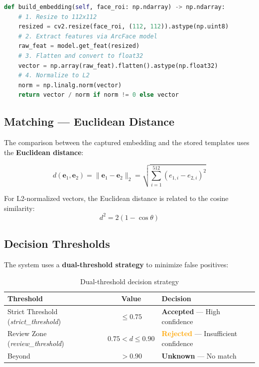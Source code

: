 \begin{lstlisting}[language=Python, caption={Building an ArcFace embedding}]
def build_embedding(self, face_roi: np.ndarray) -> np.ndarray:
    # 1. Resize to 112x112
    resized = cv2.resize(face_roi, (112, 112)).astype(np.uint8)
    # 2. Extract features via ArcFace model
    raw_feat = model.get_feat(resized)
    # 3. Flatten and convert to float32
    vector = np.array(raw_feat).flatten().astype(np.float32)
    # 4. Normalize to L2
    norm = np.linalg.norm(vector)
    return vector / norm if norm != 0 else vector
\end{lstlisting}

\subsection{Matching — Euclidean Distance}

The comparison between the captured embedding and the stored templates uses the \textbf{Euclidean distance}:

\begin{equation}
    d(\mathbf{e}_1, \mathbf{e}_2) = \|\mathbf{e}_1 - \mathbf{e}_2\|_2 = \sqrt{\sum_{i=1}^{512} (e_{1,i} - e_{2,i})^2}
\end{equation}

For L2-normalized vectors, the Euclidean distance is related to the cosine similarity:
\begin{equation}
    d^2 = 2(1 - \cos\theta)
\end{equation}

\subsection{Decision Thresholds}

The system uses a \textbf{dual-threshold strategy} to minimize false positives:

\begin{table}[H]
    \centering
    \begin{tabular}{lcl}
        \toprule
        \textbf{Threshold} & \textbf{Value} & \textbf{Decision} \\
        \midrule
        Strict Threshold (\textit{strict\_threshold}) & $\leq 0.75$ & \textcolor{accentgreen}{\textbf{Accepted}} — High confidence \\
        Review Zone (\textit{review\_threshold}) & $0.75 < d \leq 0.90$ & \textcolor{orange}{\textbf{Rejected}} — Insufficient confidence \\
        Beyond & $> 0.90$ & \textcolor{accentred}{\textbf{Unknown}} — No match \\
        \bottomrule
    \end{tabular}
    \caption{Dual-threshold decision strategy}
\end{table}

